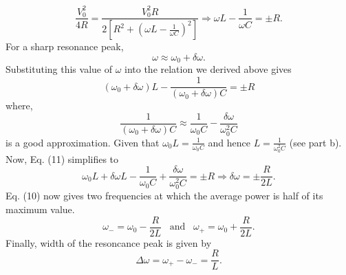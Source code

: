 \documentclass{article}
\begin{document}
\[\frac{V_0^2}{4R}=\frac{V_0^2R}{2\left[R^2+\left(\omega L-\frac{1}{\omega C}\right)^2\right]}\Rightarrow\omega L-\frac{1}{\omega C}=\pm R.\]
For a sharp resonance peak,
\begin{equation}
    \omega\approx\omega_0+\delta\omega.
\end{equation}
Substituting this value of $\omega$ into the relation we derived above gives
\begin{equation}
    (\omega_0+\delta\omega)L-\frac{1}{(\omega_0+\delta\omega)C}=\pm R
\end{equation}
where,
\[\frac{1}{(\omega_0+\delta\omega)C}\approx\frac{1}{\omega_0C}-\frac{\delta\omega}{\omega_0^2C}\]
is a good approximation. Given that $\omega_0L=\frac{1}{\omega_0C}$ and hence $L=\frac{1}{\omega_0^2C}$ (see part b). Now, Eq. (11) simplifies to
\[\omega_0L+\delta\omega L-\frac{1}{\omega_0C}+\frac{\delta\omega}{\omega_0^2C}=\pm R\Rightarrow\delta\omega=\pm\frac{R}{2L}.\]
Eq. (10) now gives two frequencies at which the average power is half of its maximum value.
\[\omega_-=\omega_0-\frac{R}{2L}\,\,\,\,\,\text{and}\,\,\,\,\,\omega_+=\omega_0+\frac{R}{2L}.\]
Finally, width of the resoncance peak is given by
\[\Delta\omega=\omega_+-\omega_-=\frac{R}{L}.\]
\end{document}

